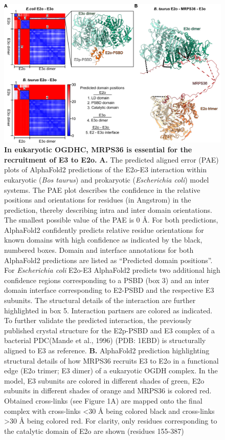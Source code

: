 \begin{figure}[hbt!]
\centering
 \includegraphics[width=\textwidth]{Chapter.5/Figures/Figure4.png}
 \caption{\textbf{In eukaryotic OGDHC, MRPS36 is essential for the recruitment of E3 to E2o.} \textbf{A.} The predicted aligned error (PAE) plots of AlphaFold2 predictions of the E2o-E3 interaction within eukaryotic (\emph{Bos taurus}) and prokaryotic (\emph{Escherichia coli}) model systems. The PAE plot describes the confidence in the relative positions and orientations for residues (in Angstrom) in the prediction, thereby describing intra and inter domain orientations. The smallest possible value of the PAE is 0 Å. For both predictions, AlphaFold2 confidently predicts relative residue orientations for known domains with high confidence as indicated by the black, numbered boxes. Domain and interface annotations for both AlphaFold2 predictions are listed as “Predicted domain positions”. For \emph{Escherichia coli} E2o-E3 AlphaFold2 predicts two additional high confidence regions corresponding to a PSBD (box 3) and an inter domain interface corresponding to E2-PSBD and the respective E3 subunits. The structural details of the interaction are further highlighted in box 5. Interaction partners are colored as indicated. To further validate the predicted interaction, the previously published crystal structure for the E2p-PSBD and E3 complex of a bacterial PDC(Mande et al., 1996) (PDB: 1EBD) is structurally aligned to E3 as reference. \textbf{B.} AlphaFold2 prediction highlighting structural details of how MRPS36 recruits E3 to E2o in a functional edge (E2o trimer; E3 dimer) of a eukaryotic OGDH complex. In the model, E3 subunits are colored in different shades of green, E2o subunits in different shades of orange and MRPS36 is colored red. Obtained cross-links (see Figure 1A) are mapped onto the final complex with cross-links <30 Å being colored black and cross-links >30 Å being colored red. For clarity, only residues corresponding to the catalytic domain of E2o are shown (residues 155-387)}
\label{fig:ch5_fig4}
\end{figure}

